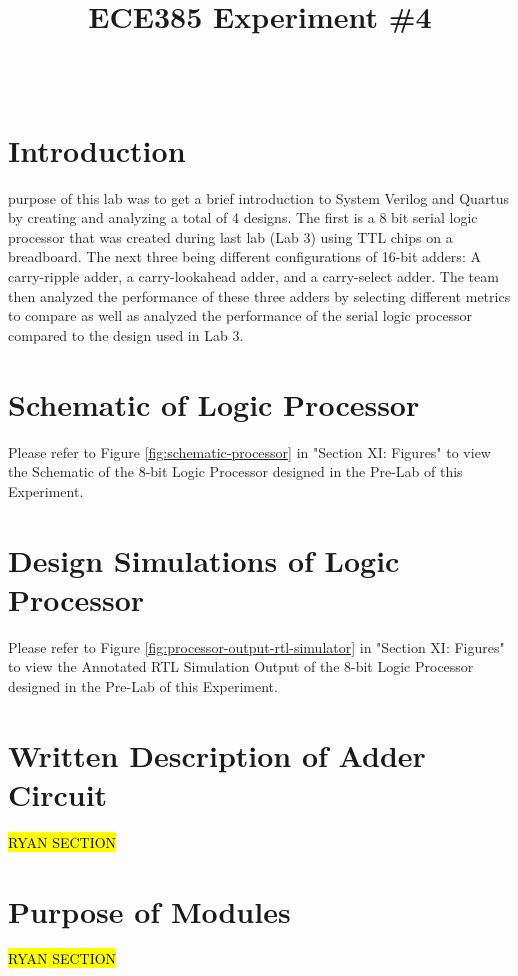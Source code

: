 \documentclass[journal, twocolumn, final,11pt,letterpaper]{IEEEtran}
\title{ECE385 Experiment \#4
	}
\author{
\IEEEauthorblockN{Eric Meyers, Ryan Helsdingen}\\
\IEEEauthorblockA{Section ABG; TAs: Ben Delay, Shuo Liu \\
February 17th, 2016 \\
emeyer7, helsdin2}}
\begin{document}
	
\maketitle
\singlespacing

\section{Introduction}
 purpose of this lab was to get a brief introduction to System Verilog and Quartus by creating and analyzing a total of 4 designs. The first is a 8 bit serial logic processor that was created during last lab (Lab 3) using TTL chips on a breadboard. The next three being different configurations of 16-bit adders: A carry-ripple adder, a carry-lookahead adder, and a carry-select adder. The team then analyzed the performance of these three adders by selecting different metrics to compare as well as analyzed the performance of the serial logic processor compared to the design used in Lab 3.

\section{Schematic of Logic Processor}
Please refer to Figure \ref{fig:schematic-processor} in "Section XI: Figures" to view the Schematic of the 8-bit Logic Processor designed in the Pre-Lab of this Experiment.

\section{Design Simulations of Logic Processor}
Please refer to Figure \ref{fig:processor-output-rtl-simulator} in "Section XI: Figures" to view the Annotated RTL Simulation Output of the 8-bit Logic Processor designed in the Pre-Lab of this Experiment.

\section{Written Description of Adder Circuit}
\hl{RYAN SECTION}

\section{Purpose of Modules}
\hl{RYAN SECTION}
\end{document}
